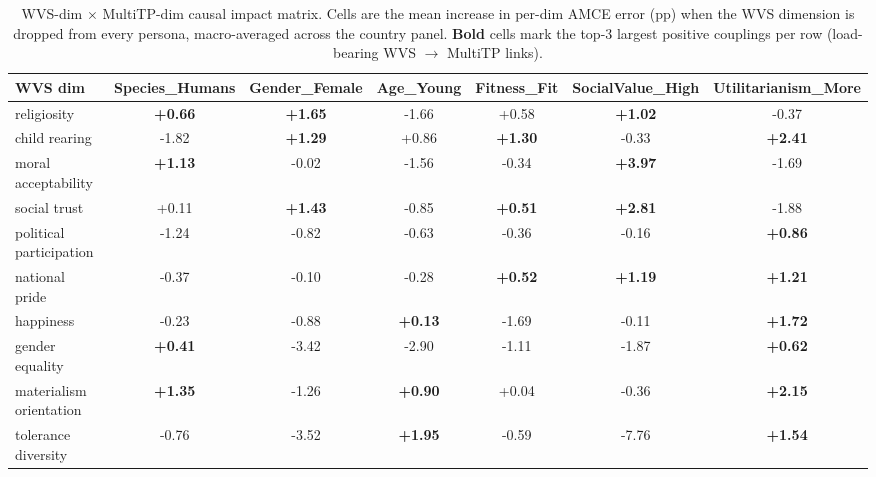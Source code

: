 \begin{table}[h]\centering\scriptsize
\caption{WVS-dim $\times$ MultiTP-dim causal impact matrix. Cells are the mean increase in per-dim AMCE error (pp) when the WVS dimension is dropped from every persona, macro-averaged across the country panel. \textbf{Bold} cells mark the top-3 largest positive couplings per row (load-bearing WVS $\to$ MultiTP links).}
\label{tab:wvs_impact_matrix}
\setlength{\tabcolsep}{4pt}
\begin{tabular}{lcccccc}\toprule
WVS dim & Species\_Humans & Gender\_Female & Age\_Young & Fitness\_Fit & SocialValue\_High & Utilitarianism\_More \\\midrule
religiosity & \textbf{+0.66} & \textbf{+1.65} & -1.66 & +0.58 & \textbf{+1.02} & -0.37 \\
child rearing & -1.82 & \textbf{+1.29} & +0.86 & \textbf{+1.30} & -0.33 & \textbf{+2.41} \\
moral acceptability & \textbf{+1.13} & -0.02 & -1.56 & -0.34 & \textbf{+3.97} & -1.69 \\
social trust & +0.11 & \textbf{+1.43} & -0.85 & \textbf{+0.51} & \textbf{+2.81} & -1.88 \\
political participation & -1.24 & -0.82 & -0.63 & -0.36 & -0.16 & \textbf{+0.86} \\
national pride & -0.37 & -0.10 & -0.28 & \textbf{+0.52} & \textbf{+1.19} & \textbf{+1.21} \\
happiness & -0.23 & -0.88 & \textbf{+0.13} & -1.69 & -0.11 & \textbf{+1.72} \\
gender equality & \textbf{+0.41} & -3.42 & -2.90 & -1.11 & -1.87 & \textbf{+0.62} \\
materialism orientation & \textbf{+1.35} & -1.26 & \textbf{+0.90} & +0.04 & -0.36 & \textbf{+2.15} \\
tolerance diversity & -0.76 & -3.52 & \textbf{+1.95} & -0.59 & -7.76 & \textbf{+1.54} \\
\bottomrule
\end{tabular}
\end{table}